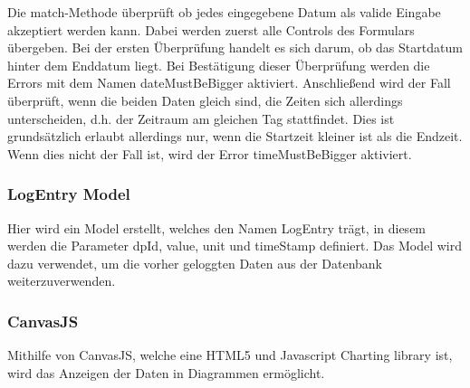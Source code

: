 Die match-Methode überprüft ob jedes eingegebene Datum als valide Eingabe akzeptiert werden kann. Dabei werden zuerst alle Controls des Formulars übergeben. Bei der ersten Überprüfung handelt es sich darum, ob das Startdatum hinter dem Enddatum liegt. Bei Bestätigung dieser Überprüfung werden die Errors mit dem Namen dateMustBeBigger aktiviert. Anschließend wird der Fall überprüft, wenn die beiden Daten gleich sind, die Zeiten sich allerdings unterscheiden, d.h. der Zeitraum am gleichen Tag stattfindet. Dies ist grundsätzlich erlaubt allerdings nur, wenn die Startzeit kleiner ist als die Endzeit. Wenn dies nicht der Fall ist, wird der Error timeMustBeBigger aktiviert.

\subsubsection{LogEntry Model}
Hier wird ein Model erstellt, welches den Namen LogEntry trägt, in diesem werden die Parameter dpId, value, unit und timeStamp definiert. Das Model wird dazu verwendet, um die vorher geloggten Daten aus der Datenbank weiterzuverwenden. 

\subsubsection{CanvasJS}
Mithilfe von CanvasJS, welche eine HTML5 und Javascript Charting library ist, wird das Anzeigen der Daten in Diagrammen ermöglicht. 